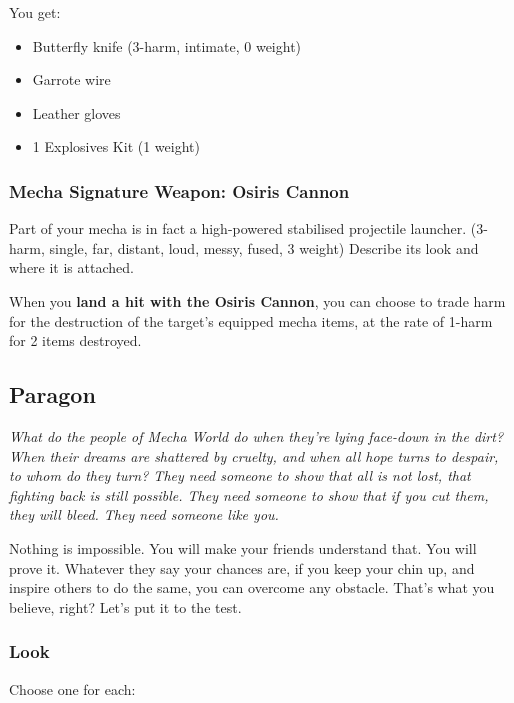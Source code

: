 You get:
\begin{itemize}
\item Butterfly knife (3-harm, intimate, 0 weight)
\item Garrote wire
\item Leather gloves
\item 1 Explosives Kit (1 weight)
\end{itemize}

\subsubsection{Mecha Signature Weapon: Osiris Cannon}
Part of your mecha is in fact a high-powered stabilised projectile launcher. (3-harm, single, far, distant, loud, messy, fused, 3 weight) Describe its look and where it is attached.

When you \textbf{land a hit with the Osiris Cannon}, you can choose to trade harm for the destruction of the target's equipped mecha items, at the rate of 1-harm for 2 items destroyed.




\subsection{Paragon}

{\itshape What do the people of Mecha World do when they're lying
  face-down in the dirt? When their dreams are shattered by cruelty,
  and when all hope turns to despair, to whom do they turn? They need
  someone to show that all is not lost, that fighting back is still
  possible. They need someone to show that if you cut them, they will
  bleed. They need someone like you.

Nothing is impossible. You will make your friends understand that. You
will prove it. Whatever they say your chances are, if you keep your
chin up, and inspire others to do the same, you can overcome any
obstacle. That's what you believe, right? Let's put it to the test.}

\subsubsection{Look}
Choose one for each:

